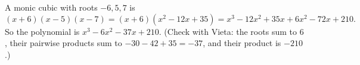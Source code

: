 A monic cubic with roots $-6,5,7$ is
\[
(x+6)(x-5)(x-7)=(x+6)(x^2-12x+35)=x^3-12x^2+35x+6x^2-72x+210 .
\]
So the polynomial is $\boxed{x^3-6x^2-37x+210}$. (Check with Vieta: the roots sum to $6$, their pairwise products sum to $-30-42+35=-37$, and their product is $-210$.)
